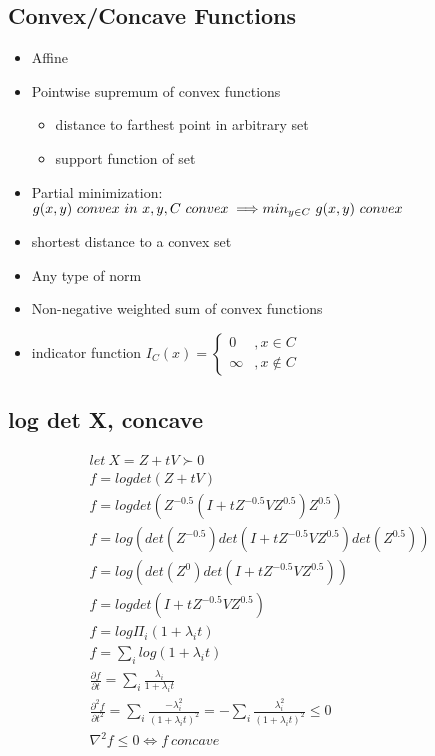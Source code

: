 \documentclass[8pt]{report}
\begin{document}
\begin{multicols*}{2}
  \section{Convex/Concave Functions}

  \begin{itemize}
  \item Affine
  \item Pointwise supremum of convex functions
    \begin{itemize}
    \item distance to farthest point in arbitrary set
    \item support function of set
    \end{itemize}
  \item Partial minimization:\\
    $g(x,y)\ convex\ in\ x,y, C\ convex \implies\\ min_{y\in C}\ g(x,y)\ convex$
  \item shortest distance to a convex set
  \item Any type of norm
  \item Non-negative weighted sum of convex functions
  \item indicator function
    $I_C(x) = \begin{cases}
      0 &, x \in C\\
      \infty &, x \not\in C
    \end{cases}$
  \end{itemize}
  
  \subsection{log det X, concave}
  \begin{align*}
    let\ X=Z+tV \succ 0\\
    f=log det(Z+tV)\\
    f=log det(Z^{-0.5}(I+tZ^{-0.5}VZ^{0.5})Z^{0.5})\\
    f=log (det(Z^{-0.5})det(I+tZ^{-0.5}VZ^{0.5})det(Z^{0.5}))\\
    f=log (det(Z^{0})det(I+tZ^{-0.5}VZ^{0.5}))\\
    f=log det(I+tZ^{-0.5}VZ^{0.5})\\
    f=log \Pi_i (1+\lambda_i t)\\
    f=\sum_i log(1+\lambda_i t)\\
    \frac{\partial f}{\partial t} = \sum_i \frac{\lambda_i}{1+\lambda_i t}\\
    \frac{\partial^2 f}{\partial t^2} = \sum_i \frac{-\lambda_i^2}{(1+\lambda_i t)^2} = -\sum_i \frac{\lambda_i^2}{(1+\lambda_i t)^2} \leq 0\\
    \nabla^2 f \leq 0 \iff f\ concave\\
  \end{align*}


\end{multicols*}
\end{document}
